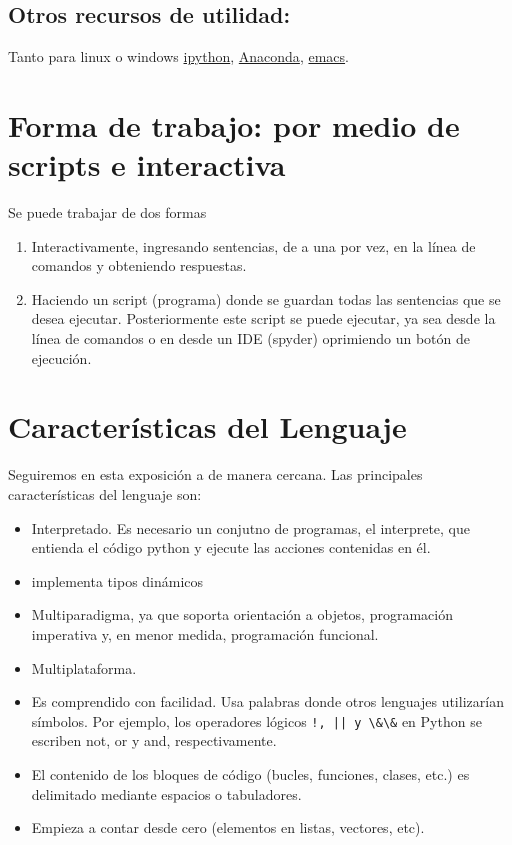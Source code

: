 \documentclass{article}
\begin{document}
\subsection{Otros recursos de utilidad:} Tanto para linux o windows \href{http://ipython.org}{ipython}, \href{http://continuum.io/downloads}{Anaconda}, \href{http://www.gnu.org/software/emacs/}{emacs}.


\section{Forma de trabajo: por medio de scripts e interactiva}


Se puede trabajar de dos formas

\begin{enumerate}
\item Interactivamente, ingresando sentencias, de a una por vez, en la línea de comandos y obteniendo respuestas.

\item Haciendo un script (programa) donde se guardan todas las sentencias que se desea ejecutar. Posteriormente este script se puede ejecutar, ya sea desde la línea de comandos o en desde un IDE (spyder) oprimiendo un botón de ejecución.

\end{enumerate}





\section{Características del Lenguaje}

Seguiremos en esta exposición a \cite{wiki_python} de manera cercana. Las principales características del lenguaje son:

\begin{itemize}
\item Interpretado. Es necesario un conjutno de programas, el interprete, que entienda el código python y ejecute las acciones contenidas en él.
\item implementa  tipos dinámicos
\item  Multiparadigma, ya que soporta orientación a objetos, programación imperativa y, en menor medida, programación funcional.
\item Multiplataforma.

\item Es comprendido  con facilidad. Usa  palabras donde otros lenguajes utilizarían símbolos. Por ejemplo, los operadores lógicos \verb~!, || y \&\&~ en Python se escriben not, or y and, respectivamente.


\item  El contenido de los bloques de código (bucles, funciones, clases, etc.) es delimitado mediante espacios o tabuladores.

\item Empieza a contar desde cero (elementos en listas, vectores, etc).



\end{itemize}
\end{document}

